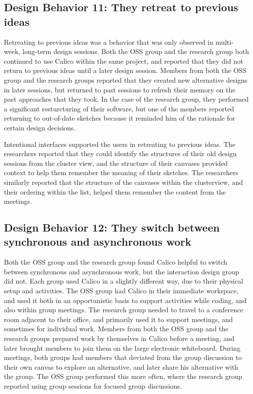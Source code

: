 \subsection{Design Behavior 11: They retreat to previous ideas}

Retreating to previous ideas was a behavior that was only observed in multi-week, long-term design sessions. Both the OSS group and the research group both continued to use Calico within the same project, and reported that they did not return to previous ideas until a later design session. Members from both the OSS group and the research groups reported that they created new alternative designs in later sessions, but returned to past sessions to refresh their memory on the past approaches that they took. In the case of the research group, they performed a significant resturcturing of their software, but one of the members reported returning to out-of-date sketches because it reminded him of the rationale for certain design decisions.

Intentional interfaces supported the users in retreating to previous ideas. The researchers reported that they could identify the structures of their old design sessions from the cluster view, and the structure of their canvases provided context to help them remember the meaning of their sketches. The researchers similarly reported that the structure of the canvases within the clusterview, and their ordering within the list, helped them remember the content from the meetings. 

\subsection{Design Behavior 12: They switch between synchronous and asynchronous work}

Both the OSS group and the research group found Calico helpful to switch between synchronous and asynchronous work, but the interaction design group did not. Each group used Calico in a slightly different way, due to their physical setup and activities. The OSS group had Calico in their immediate workspace, and used it both in an opportunistic basis to support activities while coding, and also within group meetings. The research group needed to travel to a conference room adjacent to their office, and primarily used it to support meetings, and sometimes for individual work. Members from both the OSS group and the research groups prepared work by themselves in Calico before a meeting, and later brought members to join them on the large electronic whiteboard. During meetings, both groups had members that deviated from the group discussion to their own canvas to explore an alternative, and later share his alternative with the group. The OSS group performed this more often, where the research group reported using group sessions for focused group discussions.

